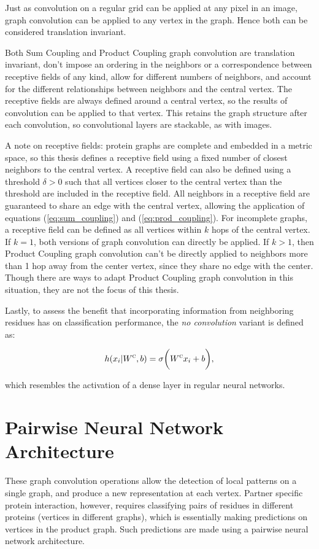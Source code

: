 Just as convolution on a regular grid can be applied at any pixel in an image, graph convolution can be applied to any vertex in the graph.
Hence both can be considered translation invariant.

Both Sum Coupling and Product Coupling graph convolution are translation invariant, don't impose an ordering in the neighbors or a correspondence between receptive fields of any kind, allow for different numbers of neighbors, and account for the different relationships between neighbors and the central vertex. 
The receptive fields are always defined around a central vertex, so the results of convolution can be applied to that vertex.
This retains the graph structure after each convolution, so convolutional layers are stackable, as with images.

A note on receptive fields: protein graphs are complete and embedded in a metric space, so this thesis defines a receptive field using a fixed number of closest neighbors to the central vertex.
A receptive field can also be defined using a threshold $\delta>0$ such that all vertices closer to the central vertex than the threshold are included in the receptive field.
All neighbors in a receptive field are guaranteed to share an edge with the central vertex, allowing the application of equations (\ref{eq:sum_coupling}) and (\ref{eq:prod_coupling}).
For incomplete graphs, a receptive field can be defined as all vertices within $k$ hops of the central vertex. 
If $k=1$, both versions of graph convolution can directly be applied.
If $k>1$, then Product Coupling graph convolution can't be directly applied to neighbors more than 1 hop away from the center vertex, since they share no edge with the center. 
Though there are ways to adapt Product Coupling graph convolution in this situation, they are not the focus of this thesis.

Lastly, to assess the benefit that incorporating information from neighboring residues has on classification performance, the \emph{no convolution} variant is defined as:

\begin{equation}
h(x_i | W^\textsc{c}, b)= \sigma \bigg( W^{\textsc{c}} x_i + b \bigg),
\label{eq:no_conv}
\end{equation}

\noindent
which resembles the activation of a dense layer in regular neural networks.


\section{Pairwise Neural Network Architecture}
These graph convolution operations allow the detection of local patterns on a single graph, and produce a new representation at each vertex.
Partner specific protein interaction, however, requires classifying pairs of residues in different proteins (vertices in different graphs), which is essentially making predictions on vertices in the product graph. 
Such predictions are made using a pairwise neural network architecture.

